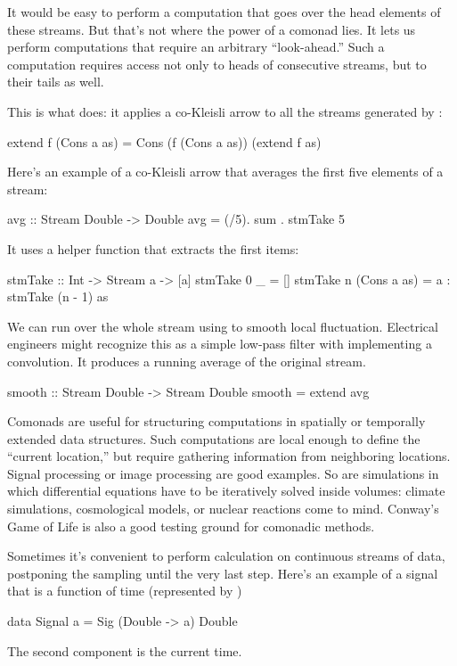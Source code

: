 \documentclass[DaoFP]{subfiles}
\begin{document}
It would be easy to perform a computation that goes over the head elements of these streams. But that's not where the power of a comonad lies. It lets us perform computations that require an arbitrary ``look-ahead.''  Such a computation requires access not only to heads of consecutive streams, but to their tails as well.

This is what  does: it applies a co-Kleisli arrow to all the streams generated by :
\begin{haskell}
  extend f (Cons a as) = Cons (f (Cons a as)) (extend f as)
\end{haskell}

Here's an example of a co-Kleisli arrow that averages the first five elements of a stream:
\begin{haskell}
avg :: Stream Double -> Double
avg  = (/5). sum . stmTake 5
\end{haskell}
It uses a helper function that extracts the first  items:
\begin{haskell}
stmTake :: Int -> Stream a -> [a]
stmTake 0 _ = []
stmTake n (Cons a as) = a : stmTake (n - 1) as
\end{haskell}

We can run  over the whole stream using  to smooth local fluctuation. Electrical engineers might recognize this as a simple low-pass filter with  implementing a convolution. It produces a running average of the original stream. 
\begin{haskell}
smooth :: Stream Double -> Stream Double
smooth = extend avg
\end{haskell}


Comonads are useful for structuring computations in spatially or temporally extended data structures. Such computations are local enough to define the ``current location,'' but require gathering information from neighboring locations. Signal processing or image processing are good examples. So are simulations in which differential equations have to be iteratively solved inside volumes: climate simulations, cosmological models, or nuclear reactions come to mind. Conway's Game of Life is also a good testing ground for comonadic methods.

Sometimes it's convenient to perform calculation on continuous streams of data, postponing the sampling until the very last step. Here's an example of a signal that is a function of time (represented by )
\begin{haskell}
data Signal a = Sig (Double -> a) Double
\end{haskell}
The second component is the current time.
\end{document}
